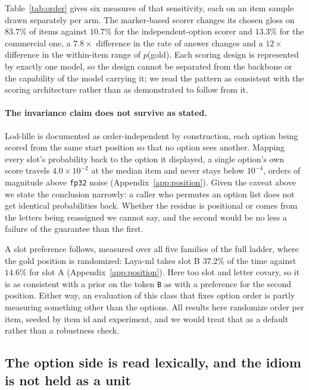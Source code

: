 \documentclass[11pt]{article}
\begin{document}
Table~\ref{tab:order} gives six measures of that sensitivity, each on an item
sample drawn separately per arm. The marker-based
scorer changes its chosen gloss on $83.7\%$ of items against $10.7\%$ for the
independent-option scorer and $13.3\%$ for the commercial one, a $7.8\times$
difference in the rate of answer changes and a $12\times$ difference in the
within-item range of $p$(gold). Each scoring design is represented by exactly one model, so the
design cannot be separated from the backbone or the capability of the model
carrying it; we read the pattern as consistent with the scoring architecture
rather than as demonstrated to follow from it.

\paragraph{The invariance claim does not survive as stated.} Lod-lille is
documented as order-independent by construction, each option being scored from the
same start position so that no option sees another. Mapping every slot's
probability back to the option it displayed, a single option's own score travels
$4.0 \times 10^{-2}$ at the median item and never stays below $10^{-4}$, orders of
magnitude above \texttt{fp32} noise (Appendix~\ref{app:position}). Given the
caveat above we state the conclusion narrowly: a caller who permutes an option
list does not get identical probabilities back. Whether the residue is positional or comes from the letters
being reassigned we cannot say, and the second would be no less a failure of the
guarantee than the first.



A slot preference follows, measured over all five families of the full ladder,
where the gold position is randomized: Laya-ml takes slot B $37.2\%$ of the time
against $14.6\%$ for slot A (Appendix~\ref{app:position}). Here too slot and letter
covary, so it is as consistent with a prior on the token \texttt{B} as with a
preference for the second position. Either way, an evaluation of this class that
fixes option order is partly measuring something other than the options. All
results here randomize order per item, seeded by item id and experiment, and we would treat that
as a default rather than a robustness check.

\subsection{The option side is read lexically, and the idiom is not held as a unit}
\label{sec:bagofwords}
\end{document}
